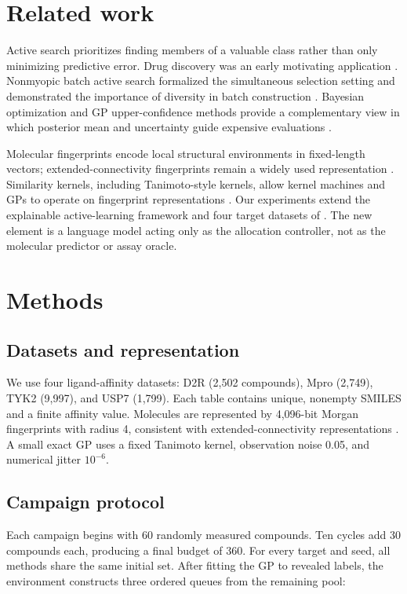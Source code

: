 \documentclass{article}
\begin{document}
\section{Related work}

Active search prioritizes finding members of a valuable class rather than only minimizing predictive error. Drug discovery was an early motivating application \citep{warmuth2001active}. Nonmyopic batch active search formalized the simultaneous selection setting and demonstrated the importance of diversity in batch construction \citep{jiang2018batch}. Bayesian optimization and GP upper-confidence methods provide a complementary view in which posterior mean and uncertainty guide expensive evaluations \citep{srinivas2010gpucb}.

Molecular fingerprints encode local structural environments in fixed-length vectors; extended-connectivity fingerprints remain a widely used representation \citep{rogers2010ecfp}. Similarity kernels, including Tanimoto-style kernels, allow kernel machines and GPs to operate on fingerprint representations \citep{ralaivola2005kernels}. Our experiments extend the explainable active-learning framework and four target datasets of \citet{srivastava2026explainable}. The new element is a language model acting only as the allocation controller, not as the molecular predictor or assay oracle.

\section{Methods}

\subsection{Datasets and representation}

We use four ligand-affinity datasets: D2R (2,502 compounds), Mpro (2,749), TYK2 (9,997), and USP7 (1,799). Each table contains unique, nonempty SMILES and a finite affinity value. Molecules are represented by 4,096-bit Morgan fingerprints with radius 4, consistent with extended-connectivity representations \citep{rogers2010ecfp}. A small exact GP uses a fixed Tanimoto kernel, observation noise 0.05, and numerical jitter $10^{-6}$.

\subsection{Campaign protocol}

Each campaign begins with 60 randomly measured compounds. Ten cycles add 30 compounds each, producing a final budget of 360. For every target and seed, all methods share the same initial set. After fitting the GP to revealed labels, the environment constructs three ordered queues from the remaining pool:
\end{document}
